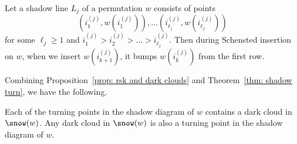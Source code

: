 \begin{ourthm}\label{thm: shadow turn}
Let a shadow line $L_j$ of a permutation $w$ consists of points
\[
\left(i^{(j)}_1,w(i^{(j)}_1)\right),\dots \left(i^{(j)}_{\ell_j},w(i^{(j)}_{\ell_j})\right)
\]
for some $\ell_j \geqslant 1$ and $i^{(j)}_1>i^{(j)}_2>\dots>i^{(j)}_{\ell_j}$. 
Then during Schensted insertion on $w$, when we insert $w(i^{(j)}_{k+1})$,
it bumps $w(i^{(j)}_{k})$ from the first row.
\end{ourthm}
 
Combining Proposition~\ref{prop: rsk and dark clouds} and Theorem~\ref{thm: shadow turn}, we have the following.

\begin{cor}
Each of the turning points in the shadow diagram of $w$ contains a dark cloud in $\snow(w)$. Any dark cloud in $\snow(w)$ is also a turning point in the shadow diagram of $w$.
\end{cor}


